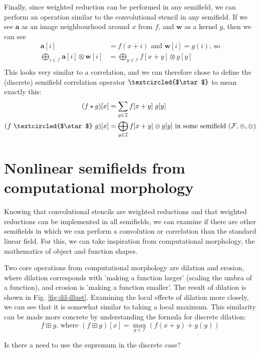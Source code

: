 \documentclass[a4paper, 12pt]{report}
\def\comment#1{\color{red}#1\color{black}}
\begin{document}
Finally, since weighted reduction can be performed in any semifield, we can perform an operation similar to the convolutional stencil in any semifield. If we see $\mathbf{a}$ as an image neighbourhood around $x$ from $f$, and $\mathbf{w}$ as a kernel $g$, then we can see
\begin{align*}
\mathbf{a}[i] &= f(x + i) \textrm{ and } \mathbf{w}[i] = g(i) \textrm{, so} \\
\bigoplus_{i\in \mathcal{I}}\mathbf{a}[i] \otimes \mathbf{w}[i]
&= \bigoplus_{y\in \mathcal{I}}f[x+y] \otimes g[y] \\
\end{align*}
This looks very similar to a correlation, and we can therefore chose to define the (discrete) semifield correlation operator $\textcircled{$\star$}$ to mean exactly this:
\begin{align*}
	(f \star g)[x] &= \sum_{y\in\mathcal{I}}f[x+y]\; g[y]\\
	(f ~\textcircled{$\star$}~ g)[x] &=\bigoplus_{y\in \mathcal{I}}f[x+y] \otimes g[y] \textrm{ in some semifield $(\mathcal{F}, \oplus, \otimes)$}
\end{align*}
\section{Nonlinear semifields from computational morphology}
Knowing that convolutional stencils are weighted reductions and that weighted reductions can be implemented in all semifields, we can examine if there are other semifields in which we can perform a convolution or correlation than the standard linear field. For this, we can take inspiration from computational morphology, the mathematics of object and function shapes.

Two core operations from computational morphology are dilation and erosion, where dilation corresponds with 'making a function larger' (scaling the umbra of a function), and erosion is 'making a function smaller'. The result of dilation is shown in Fig. \ref{fig:dil-illust}. Examining the local effects of dilation more closely, we can see that it is somewhat similar to taking a local maximum. This similarity can be made more concrete by understanding the formula for discrete dilation: 
$$f \boxplus g \textrm{, where }(f \boxplus g)[x] = \max_{y\in\mathcal{I}} \left(f(x+y) + g(y)\right)$$

\comment{Is there a need to use the supremum in the discrete case?}
\end{document}
